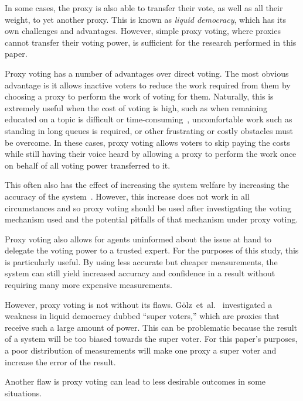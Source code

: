 In some cases, the proxy is also able to transfer their vote, as well as all
their weight, to yet another proxy.
This is known as \textit{liquid democracy}, which has its own challenges and
advantages.
However, simple proxy voting, where proxies cannot transfer their voting power,
is sufficient for the research performed in this paper.

Proxy voting has a number of advantages over direct voting.
The most obvious advantage is it allows inactive voters to reduce the work
required from them by choosing a proxy to perform the work of voting for them.
Naturally, this is extremely useful when the cost of voting is high, such as
when remaining educated on a topic is difficult or
time-consuming~\cite[para 1.1]{Mueller1972}, uncomfortable work such as standing
in long queues is required, or other frustrating or costly obstacles must be
overcome.
In these cases, proxy voting allows voters to skip paying the costs while still
having their voice heard by allowing a proxy to perform the work once on behalf
of all voting power transferred to it.

This often also has the effect of increasing the system welfare by
increasing the accuracy of the system~\cite[sec. 1.1]{Cohensius2017}.
However, this increase does not work in all circumstances and so proxy voting
should be used after investigating the voting mechanism used and the potential
pitfalls of that mechanism under proxy voting.

Proxy voting also allows for agents uninformed about the issue at hand to
delegate the voting power to a trusted expert.
For the purposes of this study, this is particularly useful.
By using less accurate but cheaper measurements, the system can still yield
increased accuracy and confidence in a result without requiring many more
expensive measurements.

However, proxy voting is not without its flaws.
Gölz~et~al.~\cite[para. 1.3]{Goelz2021} investigated a weakness in liquid
democracy dubbed ``super voters,'' which are proxies that receive such a large
amount of power.
This can be problematic because  the result of a system will be too biased
towards the super voter.
For this paper's purposes, a poor distribution of measurements will make one
proxy a super voter and increase the error of the result.

Another flaw is proxy voting can lead to less desirable outcomes in some
situations.






